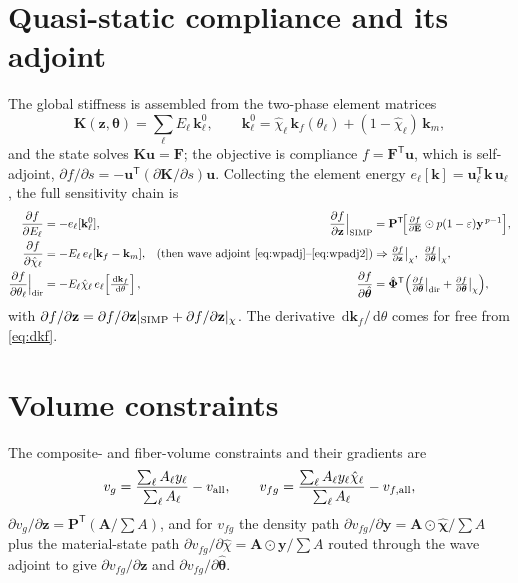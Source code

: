 \documentclass[11pt]{article}
\newcommand{\vth}{\bm{\theta}}
\newcommand{\vthh}{\hat{\bm{\theta}}}
\newcommand{\vz}{\mathbf{z}}
\newcommand{\vu}{\mathbf{u}}
\newcommand{\vy}{\mathbf{y}}
\newcommand{\vF}{\mathbf{F}}
\newcommand{\vK}{\mathbf{K}}
\newcommand{\vP}{\mathbf{P}}
\newcommand{\vPhi}{\hat{\bm{\Phi}}}
\newcommand{\vchi}{\hat{\bm{\chi}}}
\newcommand{\rmd}{\,\mathrm{d}}
\newcommand{\T}{^{\mathsf{T}}}
\begin{document}
\section{Quasi-static compliance and its adjoint}
The global stiffness is assembled from the two-phase element matrices
\begin{equation}
  \vK(\vz,\vth)=\sum_{\ell}E_\ell\,\mathbf{k}^0_\ell,\qquad
  \mathbf{k}^0_\ell=\hat\chi_\ell\,\mathbf{k}_f(\theta_\ell)
  +(1-\hat\chi_\ell)\,\mathbf{k}_m,
\end{equation}
and the state solves $\vK\vu=\vF$; the objective is compliance $f=\vF\T\vu$,
which is self-adjoint, $\partial f/\partial s=-\vu\T(\partial\vK/\partial s)\vu$.
Collecting the element energy $e_\ell[\mathbf{k}]=\vu_\ell\T\mathbf{k}\,\vu_\ell$,
the full sensitivity chain is
\begin{align}
  \frac{\partial f}{\partial E_\ell}&=-e_\ell[\mathbf{k}^0_\ell],
  &\frac{\partial f}{\partial\vz}\Big|_{\rm SIMP}
  &=\vP\T\!\Bigl[\tfrac{\partial f}{\partial\mathbf E}\odot p(1-\varepsilon)
  \vy^{\,p-1}\Bigr],\\
  \frac{\partial f}{\partial\hat\chi_\ell}&=-E_\ell\,e_\ell[\mathbf{k}_f-
  \mathbf{k}_m], &(\text{then wave adjoint}~\eqref{eq:wpadj}\text{--}
  \eqref{eq:wpadj2})&\Rightarrow
  \tfrac{\partial f}{\partial\vz}\big|_{\chi},\ \tfrac{\partial f}
  {\partial\vth}\big|_{\chi},\\
  \frac{\partial f}{\partial\theta_\ell}\Big|_{\rm dir}
  &=-E_\ell\hat\chi_\ell\,e_\ell\!\left[\tfrac{\rmd\mathbf{k}_f}{\rmd\theta}
  \right], &\frac{\partial f}{\partial\vthh}
  &=\vPhi\T\Bigl(\tfrac{\partial f}{\partial\vth}\big|_{\rm dir}
  +\tfrac{\partial f}{\partial\vth}\big|_{\chi}\Bigr),
\end{align}
with $\partial f/\partial\vz=\partial f/\partial\vz|_{\rm SIMP}+\partial f/
\partial\vz|_\chi$. The derivative $\rmd\mathbf{k}_f/\rmd\theta$ comes for free
from \eqref{eq:dkf}.

\section{Volume constraints}
The composite- and fiber-volume constraints and their gradients are
\begin{equation}
  v_g=\frac{\sum_\ell A_\ell y_\ell}{\sum_\ell A_\ell}-v_{\rm all},\qquad
  v_{fg}=\frac{\sum_\ell A_\ell y_\ell\hat\chi_\ell}{\sum_\ell A_\ell}
  -v_{f,{\rm all}},
\end{equation}
$\partial v_g/\partial\vz=\vP\T(\mathbf A/\!\sum A)$, and for $v_{fg}$ the density
path $\partial v_{fg}/\partial\vy=\mathbf A\odot\vchi/\!\sum A$ plus the
material-state path $\partial v_{fg}/\partial\hat\chi=\mathbf A\odot\vy/\!\sum A$
routed through the wave adjoint to give $\partial v_{fg}/\partial\vz$ and
$\partial v_{fg}/\partial\vthh$.
\end{document}
